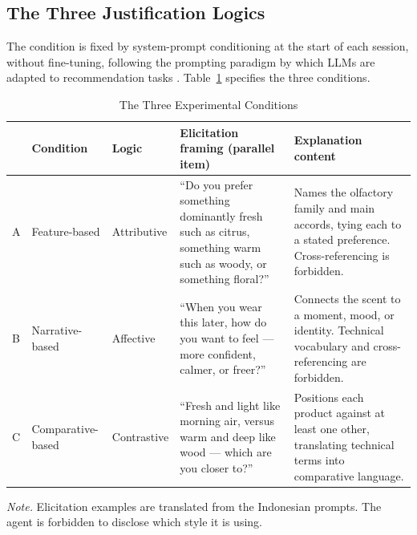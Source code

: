 \documentclass[conference]{IEEEtran}
\begin{document}
\subsection{The Three Justification Logics}

The condition is fixed by system-prompt conditioning at the start of each session, without
fine-tuning, following the prompting paradigm by which LLMs are adapted to recommendation
tasks \cite{zhao2024}. Table~\ref{tab:conditions} specifies the three conditions.

\begin{table}[htbp]
\caption{The Three Experimental Conditions}
\begin{center}
\renewcommand{\arraystretch}{1.15}
\begin{tabular}{@{}p{0.5cm}p{2.0cm}p{1.5cm}p{5.4cm}p{5.6cm}@{}}
\toprule
& \textbf{Condition} & \textbf{Logic} & \textbf{Elicitation framing (parallel item)} & \textbf{Explanation content} \\
\midrule
A & Feature-based & Attributive & ``Do you prefer something dominantly fresh such as citrus, something warm such as woody, or something floral?'' & Names the olfactory family and main accords, tying each to a stated preference. Cross-referencing is forbidden. \\
B & Narrative-based & Affective & ``When you wear this later, how do you want to feel --- more confident, calmer, or freer?'' & Connects the scent to a moment, mood, or identity. Technical vocabulary and cross-referencing are forbidden. \\
C & Comparative-based & Contrastive & ``Fresh and light like morning air, versus warm and deep like wood --- which are you closer to?'' & Positions each product against at least one other, translating technical terms into comparative language. \\
\bottomrule
\end{tabular}
\label{tab:conditions}
\end{center}
\footnotesize\textit{Note.} Elicitation examples are translated from the Indonesian
prompts. The agent is forbidden to disclose which style it is using.
\end{table}
\end{document}
